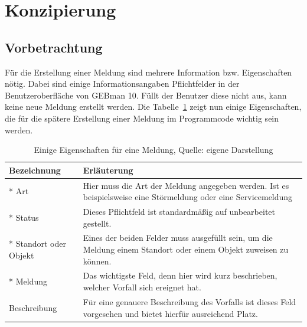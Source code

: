 \section{Konzipierung}

\subsection{Vorbetrachtung}
\noindent
Für die Erstellung einer Meldung sind mehrere Information bzw. Eigenschaften nötig. Dabei sind einige Informationsangaben Pflichtfelder in der Benutzeroberfläche von GEBman 10. Füllt der Benutzer diese nicht aus, kann keine neue Meldung erstellt werden. Die Tabelle~\ref{tab:Medlungseigenschaften} zeigt nun einige Eigenschaften, die für die spätere Erstellung einer Meldung im Programmcode wichtig sein werden.

\begin{table}[h!]
    \begin{tabular}{ | l | p{11cm}|}
    \hline
    Bezeichnung & Erläuterung \\ \hline
 * Art & Hier muss die Art der Meldung angegeben werden. Ist es beispielsweise eine Störmeldung oder eine Servicemeldung \\ \hline
 * Status & Dieses Pflichtfeld ist standardmäßig auf unbearbeitet gestellt.  \\ \hline
* Standort oder Objekt & Eines der beiden Felder muss ausgefüllt sein, um die Meldung einem Standort oder einem Objekt zuweisen zu können. \\ \hline
* Meldung & Das wichtigste Feld, denn hier wird kurz beschrieben, welcher Vorfall sich ereignet hat. \\ \hline
Beschreibung & Für eine genauere Beschreibung des Vorfalls ist dieses Feld vorgesehen und bietet hierfür ausreichend Platz. \\ \hline
    \end{tabular}
    \caption[Einige Eigenschaften für eine Meldung]{Einige Eigenschaften für eine Meldung, Quelle: eigene Darstellung}
    \label{tab:Medlungseigenschaften}
\end{table}


